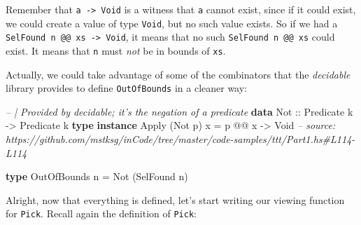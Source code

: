 \documentclass[]{article}
\newenvironment{Shaded}{}{}
\newcommand{\CommentTok}[1]{\textcolor[rgb]{0.38,0.63,0.69}{\textit{#1}}}
\newcommand{\DataTypeTok}[1]{\textcolor[rgb]{0.56,0.13,0.00}{#1}}
\newcommand{\FunctionTok}[1]{\textcolor[rgb]{0.02,0.16,0.49}{#1}}
\newcommand{\KeywordTok}[1]{\textcolor[rgb]{0.00,0.44,0.13}{\textbf{#1}}}
\newcommand{\NormalTok}[1]{#1}
\newcommand{\OtherTok}[1]{\textcolor[rgb]{0.00,0.44,0.13}{#1}}
\begin{document}
Remember that \texttt{a\ -\textgreater{}\ Void} is a witness that \texttt{a}
cannot exist, since if it could exist, we could create a value of type
\texttt{Void}, but no such value exists. So if we had a
\texttt{SelFound\ n\ @@\ xs\ -\textgreater{}\ Void}, it means that no such
\texttt{SelFound\ n\ @@\ xs} could exist. It means that \texttt{n} must
\emph{not} be in bounds of \texttt{xs}.

Actually, we could take advantage of some of the combinators that the
\emph{decidable} library provides to define \texttt{OutOfBounds} in a cleaner
way:

\begin{Shaded}
\begin{Highlighting}[]
\CommentTok{-- | Provided by decidable; it's the negation of a predicate}
\KeywordTok{data} \DataTypeTok{Not}\OtherTok{ ::} \DataTypeTok{Predicate}\NormalTok{ k }\OtherTok{->} \DataTypeTok{Predicate}\NormalTok{ k}
\KeywordTok{type} \KeywordTok{instance} \DataTypeTok{Apply}\NormalTok{ (}\DataTypeTok{Not}\NormalTok{ p) x }\FunctionTok{=}\NormalTok{ p }\FunctionTok{@@}\NormalTok{ x }\OtherTok{->} \DataTypeTok{Void}
\CommentTok{-- source: https://github.com/mstksg/inCode/tree/master/code-samples/ttt/Part1.hs#L114-L114}

\KeywordTok{type} \DataTypeTok{OutOfBounds}\NormalTok{ n }\FunctionTok{=} \DataTypeTok{Not}\NormalTok{ (}\DataTypeTok{SelFound}\NormalTok{ n)}
\end{Highlighting}
\end{Shaded}

Alright, now that everything is defined, let's start writing our viewing
function for \texttt{Pick}. Recall again the definition of \texttt{Pick}:
\end{document}
